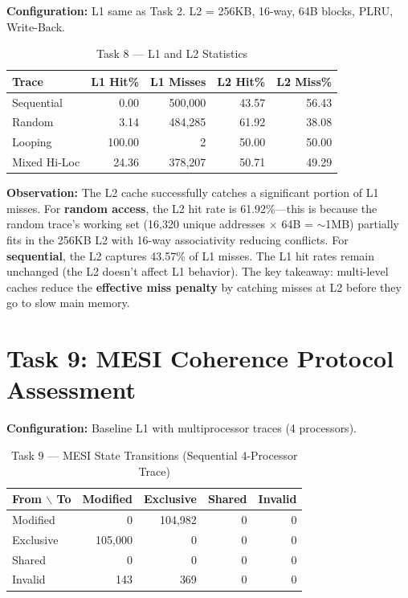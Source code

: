 \documentclass[12pt,a4paper]{article}
\begin{document}
\textbf{Configuration:} L1 same as Task 2. L2 = 256KB, 16-way, 64B blocks, PLRU, Write-Back.

\begin{table}[H]
\centering
\caption{Task 8 --- L1 and L2 Statistics}
\begin{tabular}{lrr|rr}
\toprule
\textbf{Trace} & \textbf{L1 Hit\%} & \textbf{L1 Misses} & \textbf{L2 Hit\%} & \textbf{L2 Miss\%} \\
\midrule
Sequential     & 0.00  & 500,000 & 43.57 & 56.43 \\
Random         & 3.14  & 484,285 & 61.92 & 38.08 \\
Looping        & 100.00& 2       & 50.00 & 50.00 \\
Mixed Hi-Loc   & 24.36 & 378,207 & 50.71 & 49.29 \\
\bottomrule
\end{tabular}
\end{table}

\textbf{Observation:} The L2 cache successfully catches a significant portion of L1 misses. For \textbf{random access}, the L2 hit rate is 61.92\%---this is because the random trace's working set (16,320 unique addresses $\times$ 64B = $\sim$1MB) partially fits in the 256KB L2 with 16-way associativity reducing conflicts. For \textbf{sequential}, the L2 captures 43.57\% of L1 misses. The L1 hit rates remain unchanged (the L2 doesn't affect L1 behavior). The key takeaway: multi-level caches reduce the \textbf{effective miss penalty} by catching misses at L2 before they go to slow main memory.

\section{Task 9: MESI Coherence Protocol Assessment}

\textbf{Configuration:} Baseline L1 with multiprocessor traces (4 processors).

\begin{table}[H]
\centering
\caption{Task 9 --- MESI State Transitions (Sequential 4-Processor Trace)}
\begin{tabular}{lrrrr}
\toprule
\textbf{From $\backslash$ To} & \textbf{Modified} & \textbf{Exclusive} & \textbf{Shared} & \textbf{Invalid} \\
\midrule
Modified  & 0      & 104,982 & 0 & 0 \\
Exclusive & 105,000& 0       & 0 & 0 \\
Shared    & 0      & 0       & 0 & 0 \\
Invalid   & 143    & 369     & 0 & 0 \\
\bottomrule
\end{tabular}
\end{table}
\end{document}
